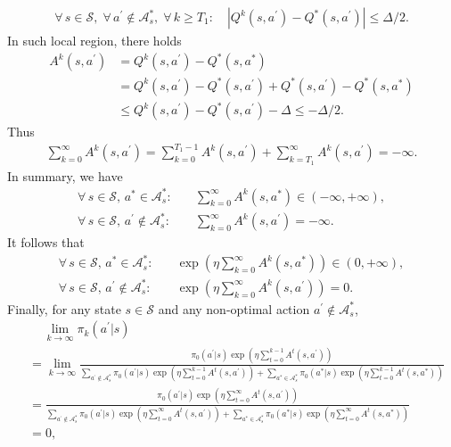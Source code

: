 \documentclass[10pt]{article}
\newcommand{\calA}{\mathcal{A}}
\newcommand{\calS}{\mathcal{S}}
\newcommand{\ls}{\left}
\newcommand{\rs}{\right}
\theoremstyle{plain}
\theoremstyle{definition}
\begin{document}
\begin{align*}
    \forall\, s\in\calS, \; \forall\, a^\prime \not\in\calA^*_s, \; \forall\, k\geq T_1: \quad |Q^k(s,a^\prime) - Q^*(s,a^\prime)| \leq \Delta / 2.
\end{align*}
In such local region, there holds
\begin{align*}
    A^k(s,a^\prime) &= Q^k(s,a^\prime) - Q^*(s,a^*) \\
    &= Q^k(s,a^\prime) - Q^*(s,a^\prime) + Q^*(s,a^\prime) - Q^*(s,a^*) \\
    &\leq Q^k(s,a^\prime) - Q^*(s,a^\prime) - \Delta \leq -\Delta /2.
\end{align*}
Thus
\begin{align*}
    \sum_{k=0}^\infty A^k(s,a^\prime) = \sum_{k=0}^{T_1-1} A^k(s,a^\prime) + \sum_{k=T_1}^\infty A^k(s,a^\prime) = -\infty.
\end{align*}
In summary, we have 
\begin{align*}
    \forall\, s \in \calS, \, a^* \in \calA^*_s: \quad &\sum_{k=0}^\infty A^k(s,a^*) \in (-\infty, +\infty), \\
    \forall\, s \in \calS, \, a^\prime \not \in \calA^*_s: \quad &\sum_{k=0}^\infty A^k(s,a^\prime) = -\infty.
\end{align*}
It follows that
\begin{align*}
    \forall\, s \in \calS, \, a^* \in \calA^*_s: \quad &\exp\ls(\eta\sum_{k=0}^\infty A^k(s,a^*)\rs) \in (0, +\infty), \\
    \forall\, s \in \calS, \, a^\prime \not \in \calA^*_s: \quad &\exp\ls(\eta\sum_{k=0}^\infty A^k(s,a^\prime)\rs) = 0.
\end{align*}
Finally, for any state $s \in \calS$ and any non-optimal action $a^\prime \not\in \calA^*_s$,
    \begin{align*}
        &\phantom{\quad\,}\lim_{k\to\infty} \pi_k(a^\prime|s) \\
        &= \lim_{k\to\infty} \frac{\pi_0(a^\prime|s) \exp (\eta\sum_{t=0}^{k-1} A^t(s,a^\prime))}{\sum_{a^\prime\not\in\calA^*_s} \pi_0(a^\prime|s) \exp (\eta\sum_{t=0}^{k-1} A^t(s,a^\prime)) + \sum_{a^*\in\calA^*_s} \pi_0(a^*|s) \exp (\eta\sum_{t=0}^{k-1} A^t(s,a^*))} \\
        &= \frac{\pi_0(a^\prime|s) \exp (\eta\sum_{t=0}^{\infty} A^t(s,a^\prime))}{\sum_{a^\prime\not\in\calA^*_s} \pi_0(a^\prime|s) \exp (\eta\sum_{t=0}^{\infty} A^t(s,a^\prime)) + \sum_{a^*\in\calA^*_s} \pi_0(a^*|s) \exp (\eta\sum_{t=0}^{\infty} A^t(s,a^*))} \\[.5em]
        &= 0,
    \end{align*}
\end{document}
